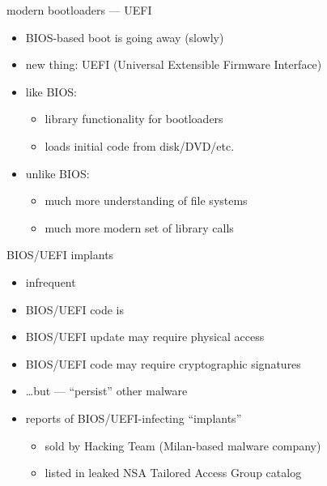 \begin{frame}{modern bootloaders --- UEFI}
    \begin{itemize}
    \item BIOS-based boot is going away (slowly)
    \item new thing: UEFI (Universal Extensible Firmware Interface)
    \item like BIOS:
        \begin{itemize}
        \item library functionality for bootloaders
        \item loads initial code from disk/DVD/etc.
        \end{itemize}
    \item unlike BIOS:
        \begin{itemize}
        \item much more understanding of file systems
        \item much more modern set of library calls
        \end{itemize}
    \end{itemize}
\end{frame}


\begin{frame}{BIOS/UEFI implants}
    \begin{itemize}
    \item infrequent
    \item BIOS/UEFI code is 
    \item BIOS/UEFI update may require physical access
    \item BIOS/UEFI code may require cryptographic signatures
    \item \ldots but  --- ``persist'' other malware
    \item reports of BIOS/UEFI-infecting ``implants''
        \begin{itemize}
        \item sold by Hacking Team (Milan-based malware company) 
        \item listed in leaked NSA Tailored Access Group catalog
        \end{itemize}
    \end{itemize}
\end{frame}


